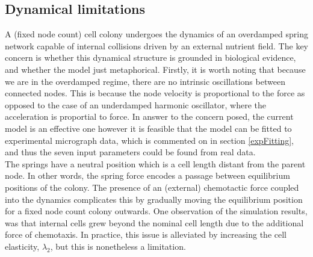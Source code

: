 \subsection{Dynamical limitations}
A (fixed node count) cell colony undergoes the dynamics of an overdamped spring network capable
of internal collisions driven by
an external nutrient field. The key concern is whether this dynamical structure is grounded in 
biological evidence, and whether the model just metaphorical. Firstly, 
it is worth noting that because we are in the overdamped regime,
there are no intrinsic oscillations between connected nodes. This is because the node velocity 
is proportional to the force as opposed to the case 
of an underdamped harmonic oscillator, where the acceleration is proportial to force.
In answer to the concern posed, the current model is an effective one however
it is feasible that the model can be fitted to experimental micrograph data, 
which is commented on in section \ref{expFitting}, and thus the seven input parameters 
could be found from real data.
\\

The springs have a neutral position which is a cell length distant from the parent node.
In other words, the spring force encodes a passage between equilibrium positions of the colony.
The presence of an (external) chemotactic force coupled into the dynamics complicates 
this by gradually moving the equilibrium position for a fixed node count colony outwards.
One observation of the simulation results, was that internal cells grew beyond the nominal cell length
due to the additional force of chemotaxis. In practice,
this issue is alleviated by increasing the cell elasticity, $\lambda_2$, but this 
is nonetheless a limitation.
\\

